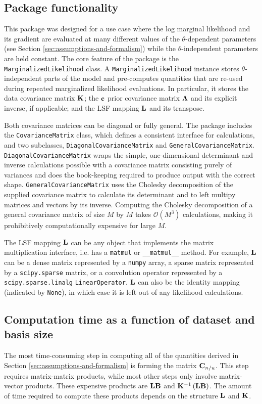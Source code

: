 \documentclass[manuscript]{aastex62}
\newcommand{\vx}[1]{{\bf {#1}}}
\begin{document}
\subsection{Package functionality}
\label{sec:package-functionality}
This package was designed for a use case where the log marginal likelihood and its gradient are evaluated at many different values of the $\theta$-dependent parameters (see Section \ref{sec:assumptions-and-formalism}) while the $\theta$-independent parameters are held constant.
The core feature of the package is the \texttt{MarginalizedLikelihood} class.
A \texttt{MarginalizedLikelihood} instance stores $\theta$-independent parts of the model and pre-computes quantities that are re-used during repeated marginalized likelihood evaluations.
In particular, it stores the data covariance matrix $\vx{K}$; the $\vx{c}$ prior covariance matrix $\vx{\Lambda}$ and its explicit inverse, if applicable; and the LSF mapping $\vx{L}$ and its transpose.

Both covariance matrices can be diagonal or fully general.
The package includes the \texttt{CovarianceMatrix} class, which defines a consistent interface for calculations, and two subclasses, \texttt{DiagonalCovarianceMatrix} and \texttt{GeneralCovarianceMatrix}.
\texttt{DiagonalCovarianceMatrix} wraps the simple, one-dimensional determinant and inverse calculations possible with a covariance matrix consisting purely of variances and does the book-keeping required to produce output with the correct shape.
\texttt{GeneralCovarianceMatrix} uses the Cholesky decomposition of the supplied covariance matrix to calculate its determinant and to left multipy matrices and vectors by its inverse.
Computing the Cholesky decomposition of a general covariance matrix of size $M$ by $M$ takes $\mathcal{O}(M^3)$ calculations, making it prohibitively computationally expensive for large $M$.

The LSF mapping $\vx{L}$ can be any object that implements the matrix multiplication interface, i.e. has a \texttt{matmul} or \texttt{\_\_matmul\_\_} method.
For example, $\vx{L}$ can be a dense matrix represented by a \texttt{numpy} array, a sparse matrix represented by a \texttt{scipy.sparse} matrix, or a convolution operator represented by a \texttt{scipy.sparse.linalg} \texttt{LinearOperator}.
$\vx{L}$ can also be the identity mapping (indicated by \texttt{None}), in which case it is left out of any likelihood calculations.


\subsection{Computation time as a function of dataset and basis size}
\label{sec:scaling}
The most time-consuming step in computing all of the quantities derived in Section \ref{sec:assumptions-and-formalism} is forming the matrix $\vx{C}_{n/u}$.
This step requires matrix-matrix products, while most other steps only involve matrix-vector products.
These expensive products are $\vx{L}\vx{B}$ and $\vx{K}^{-1} \left(\vx{L} \vx{B}\right)$.
The amount of time required to compute these products depends on the structure $\vx{L}$ and $\vx{K}$.
\end{document}

